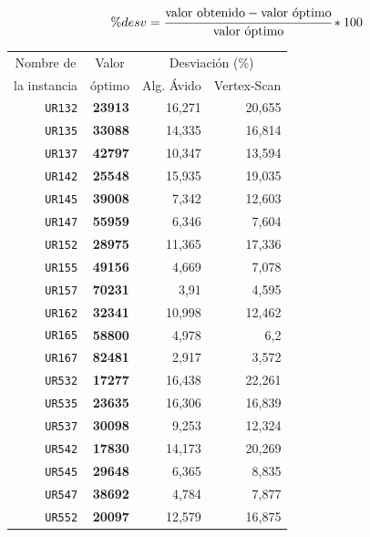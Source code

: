 \documentclass[11pt]{article}
\begin{document}
\begin{equation}
    \%desv = \cfrac{\text{valor obtenido} - \text{valor óptimo}}{\text{valor óptimo}} *100
\end{equation}


\begin{table}[htbp]
   \begin{center}
   \begin{tabular}{|r|r|r|r|}
   \hline
   \multicolumn{1}{|c|}{Nombre de} & \multicolumn{1}{c|}{Valor} & \multicolumn{ 2}{c|}{Desviación (\%) } \\ \cline{3-4}
   \multicolumn{1}{|c|}{la instancia} & \multicolumn{1}{c|}{óptimo} & \multicolumn{1}{c|}{Alg. Ávido} & \multicolumn{1}{c|}{Vertex-Scan} \\ \hline
   \texttt{UR132} & \textbf{23913} & 16,271 & 20,655 \\ 
   \texttt{UR135} & \textbf{33088} & 14,335 & 16,814 \\ 
   \texttt{UR137} & \textbf{42797} & 10,347 & 13,594 \\ 
   \texttt{UR142} & \textbf{25548} & 15,935 & 19,035 \\ 
   \texttt{UR145} & \textbf{39008} &  7,342 & 12,603 \\ 
   \texttt{UR147} & \textbf{55959} &  6,346 &  7,604 \\ 
   \texttt{UR152} & \textbf{28975} & 11,365 & 17,336 \\ 
   \texttt{UR155} & \textbf{49156} &  4,669 &  7,078 \\ 
   \texttt{UR157} & \textbf{70231} &   3,91 &  4,595 \\ 
   \texttt{UR162} & \textbf{32341} & 10,998 & 12,462 \\ 
   \texttt{UR165} & \textbf{58800} &  4,978 &    6,2 \\ 
   \texttt{UR167} & \textbf{82481} &  2,917 & 3,572 \\ 
   \texttt{UR532} & \textbf{17277} & 16,438 & 22,261 \\ 
   \texttt{UR535} & \textbf{23635} & 16,306 & 16,839 \\ 
   \texttt{UR537} & \textbf{30098} &  9,253 & 12,324 \\ 
   \texttt{UR542} & \textbf{17830} & 14,173 & 20,269 \\ 
   \texttt{UR545} & \textbf{29648} &  6,365 & 8,835 \\ 
   \texttt{UR547} & \textbf{38692} &  4,784 & 7,877 \\ 
   \texttt{UR552} & \textbf{20097} & 12,579 & 16,875 \\ 

\end{tabular}
\end{center}
\end{table}
\end{document}
